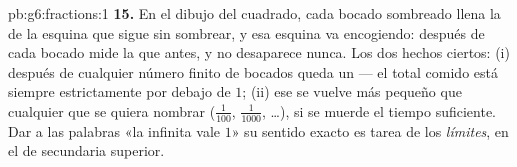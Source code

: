 \begin{solution}{pb:g6:fractions:1}
\textbf{15.} En el dibujo del cuadrado, cada bocado sombreado llena la 
de la esquina que sigue sin sombrear, y esa esquina va
encogiendo: después de cada bocado mide la  que antes, y
no desaparece nunca. Los dos hechos ciertos: (i) después de cualquier número
finito de bocados queda un  --- el total comido está
siempre estrictamente por debajo de $1$; (ii) ese  se vuelve más pequeño
que cualquier  que se quiera nombrar ($\frac{1}{100}$,
$\frac{1}{1000}$, \dots), si se muerde el tiempo suficiente. Dar a las
palabras «la  infinita vale $1$» su sentido exacto es
tarea de los \emph{límites}, en el  de secundaria superior.
\end{solution}
